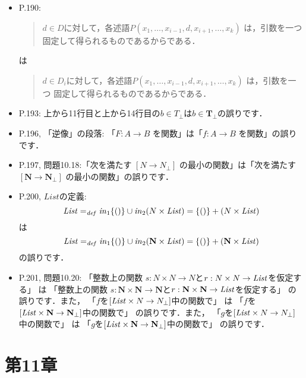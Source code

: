 \documentclass[12pt,titlepage,twoside,openright,dvipdfmx]{jsbook}
\theoremstyle{definition}
\begin{document}
\begin{itemize}
\item P.190:
  \begin{quote}
    $d\in D$に対して，各述語$P(x_1,\ldots,x_{i-1},d,x_{i+1},\ldots,x_k)$ は，引数を一つ
    固定して得られるものであるから\inclusive{}である．
  \end{quote}
  は
  \begin{quote}
    $d\in D_i$に対して，各述語$P(x_1,\ldots,x_{i-1},d,x_{i+1},\ldots,x_k)$ は，引数を一つ
    固定して得られるものであるから\inclusive{}である．
  \end{quote}
\item P.193: 上から11行目と上から14行目の$b\in T_\bot$は$b\in \mathbf{T}_\bot$の誤りです．
\item P.196, 「逆像」の段落: 「$F:A\to B$ を関数」は「$f:A\to B$ を関数」の誤りです．
\item P.197, 問題10.18:「次を満たす $[N\to N_\bot]$ の最小の関数」は「次を満たす $[\mathbf{N}\to \mathbf{N}_\bot]$ の最小の関数」の誤りです．
\item P.200, $\mathit{List}$の定義:
  \[
    {\it List} =_{\mathit{def}} {\it in}_1\{()\} \cup {\it in}_2(N\times{\it List}) =
    \{()\} + (N\times{\it List})
  \]
  は
  \[
    {\it List} =_{\mathit{def}} {\it in}_1\{()\} \cup {\it in}_2(\mathbf{N}\times{\it List}) =
    \{()\} + (\mathbf{N}\times{\it List})
  \]
  の誤りです．
\item P.201, 問題10.20:
  「整数上の関数 $s:N\times N\to N$と$r:N\times N\to{\it List}$を仮定する」
  は
  「整数上の関数 $s:\mathbf{N}\times \mathbf{N}\to \mathbf{N}$と$r:\mathbf{N}\times \mathbf{N}\to{\it List}$を仮定する」
  の誤りです．また，
  「$f$を$[{\it List}\times N\to N_\bot]$中の関数で」
  は
  「$f$を$[{\it List}\times \mathbf{N}\to \mathbf{N}_\bot]$中の関数で」
  の誤りです．また，
  「$g$を$[{\it List}\times N\to N_\bot]$中の関数で」
  は
  「$g$を$[{\it List}\times \mathbf{N}\to \mathbf{N}_\bot]$中の関数で」
  の誤りです．
\end{itemize}

\section*{第11章}
\end{document}

